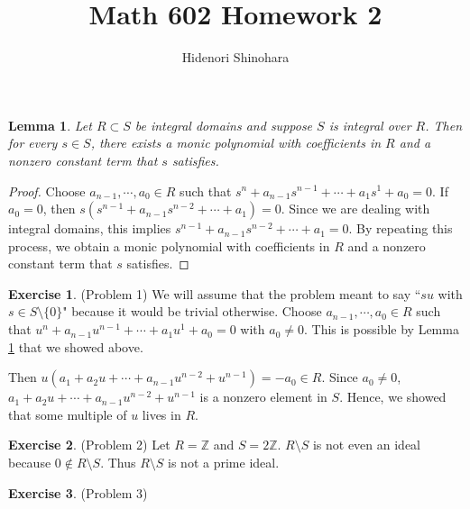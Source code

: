 \documentclass[12pt, psamsfonts]{amsart}
\newtheorem{lem}[thm]{Lemma}
\theoremstyle{definition}
\newtheorem*{exer}{Exercise}
\theoremstyle{remark}
\numberwithin{equation}{section}
\begin{document}
\title{Math 602 Homework 2}
\author{Hidenori Shinohara}
\maketitle

\begin{lem}\label{integral}
  Let $R \subset S$ be integral domains and suppose $S$ is integral over $R$.
  Then for every $s \in S$, there exists a monic polynomial with coefficients in $R$ and a nonzero constant term that $s$ satisfies.
\end{lem}

\begin{proof}
  Choose $a_{n - 1}, \cdots, a_0 \in R$ such that $s^n + a_{n - 1}s^{n - 1} + \cdots + a_1s^1 + a_0 = 0$.
  If $a_0 = 0$, then $s(s^{n - 1} + a_{n - 1}s^{n - 2} + \cdots + a_1) = 0$.
  Since we are dealing with integral domains, this implies $s^{n - 1} + a_{n - 1}s^{n - 2} + \cdots + a_1 = 0$.
  By repeating this process, we obtain a monic polynomial with coefficients in $R$ and a nonzero constant term that $s$ satisfies.
\end{proof}

\begin{exer}{(Problem 1)}
  We will assume that the problem meant to say ``$su$ with $s \in S \setminus \{ 0 \}$" because it would be trivial otherwise.
  Choose $a_{n - 1}, \cdots, a_0 \in R$ such that $u^n + a_{n - 1}u^{n - 1} + \cdots + a_1u^1 + a_0 = 0$ with $a_0 \ne 0$.
  This is possible by Lemma \ref{integral} that we showed above.

  Then $u(a_1 + a_2u + \cdots + a_{n - 1}u^{n - 2} + u^{n - 1}) = -a_0 \in R$.
  Since $a_0 \ne 0$, $a_1 + a_2u + \cdots + a_{n - 1}u^{n - 2} + u^{n - 1}$ is a nonzero element in $S$.
  Hence, we showed that some multiple of $u$ lives in $R$.
\end{exer}

\begin{exer}{(Problem 2)}
  Let $R = \mathbb{Z}$ and $S = 2\mathbb{Z}$.
  $R \setminus S$ is not even an ideal because $0 \notin R \setminus S$.
  Thus $R \setminus S$ is not a prime ideal.
\end{exer}

\begin{exer}{(Problem 3)}
\end{exer}
\end{document}
